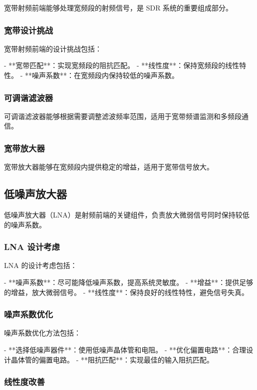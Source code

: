 \documentclass[UTF8]{ctexbook}
\begin{document}
宽带射频前端能够处理宽频段的射频信号，是 SDR 系统的重要组成部分。

\subsubsection{宽带设计挑战}

宽带射频前端的设计挑战包括：

- **宽带匹配**：实现宽频段的阻抗匹配。
- **线性度**：保持宽频段的线性特性。
- **噪声系数**：在宽频段内保持较低的噪声系数。

\subsubsection{可调谐滤波器}

可调谐滤波器能够根据需要调整滤波频率范围，适用于宽带频谱监测和多频段通信。

\subsubsection{宽带放大器}

宽带放大器能够在宽频段内提供稳定的增益，适用于宽带信号放大。

\subsection{低噪声放大器}

低噪声放大器（LNA）是射频前端的关键组件，负责放大微弱信号同时保持较低的噪声系数。

\subsubsection{LNA 设计考虑}

LNA 的设计考虑包括：

- **噪声系数**：尽可能降低噪声系数，提高系统灵敏度。
- **增益**：提供足够的增益，放大微弱信号。
- **线性度**：保持良好的线性特性，避免信号失真。

\subsubsection{噪声系数优化}

噪声系数优化方法包括：

- **选择低噪声器件**：使用低噪声晶体管和电阻。
- **优化偏置电路**：合理设计晶体管的偏置电路。
- **阻抗匹配**：实现最佳的输入阻抗匹配。

\subsubsection{线性度改善}
\end{document}
